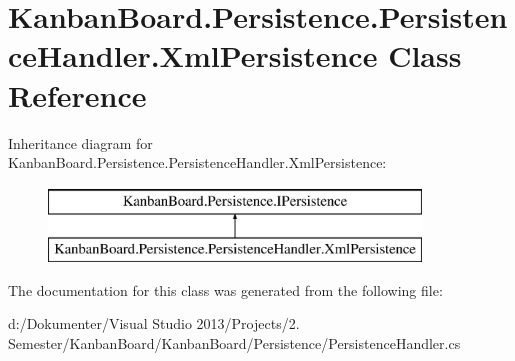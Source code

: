 \hypertarget{class_kanban_board_1_1_persistence_1_1_persistence_handler_1_1_xml_persistence}{}\section{Kanban\+Board.\+Persistence.\+Persistence\+Handler.\+Xml\+Persistence Class Reference}
\label{class_kanban_board_1_1_persistence_1_1_persistence_handler_1_1_xml_persistence}
Inheritance diagram for Kanban\+Board.\+Persistence.\+Persistence\+Handler.\+Xml\+Persistence\+:\begin{figure}[H]
\begin{center}
\leavevmode
\includegraphics[height=2.000000cm]{class_kanban_board_1_1_persistence_1_1_persistence_handler_1_1_xml_persistence}
\end{center}
\end{figure}


The documentation for this class was generated from the following file\+:\begin{DoxyCompactItemize}
\item 
d\+:/\+Dokumenter/\+Visual Studio 2013/\+Projects/2. Semester/\+Kanban\+Board/\+Kanban\+Board/\+Persistence/Persistence\+Handler.\+cs\end{DoxyCompactItemize}
